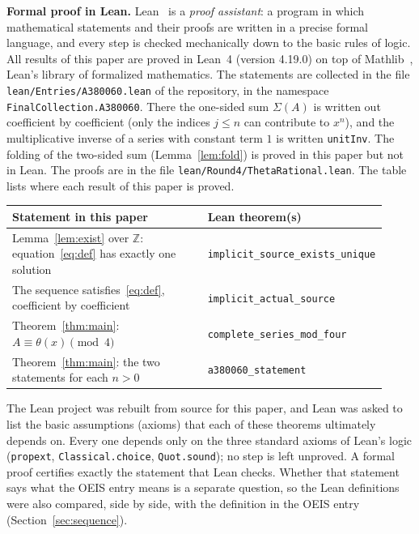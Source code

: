 \documentclass[11pt,a4paper]{article}
\theoremstyle{definition}
\theoremstyle{remark}
\newcommand{\Z}{\mathbb{Z}}
\newcommand{\para}[1]{\par\medskip\noindent\textbf{#1}\enspace}
\begin{document}
\para{Formal proof in Lean.}
Lean~\cite{lean} is a \emph{proof assistant}: a program in which mathematical statements and their proofs are written
in a precise formal language, and every step is checked mechanically down to the basic rules of logic. All results of
this paper are proved in Lean~4 (version 4.19.0) on top of Mathlib~\cite{mathlib}, Lean's library of formalized
mathematics. The statements are collected in the file \texttt{lean/Entries/A380060.lean} of the repository,
in the namespace \texttt{FinalCollection.A380060}. There the one-sided sum $\Sigma(A)$ is written out coefficient by coefficient (only the indices $j\le n$ can contribute to $x^n$), and the multiplicative inverse of a series with constant term $1$ is written \texttt{unitInv}. The folding of the two-sided sum (Lemma~\ref{lem:fold}) is proved in this paper but not in Lean. The proofs are in the file \texttt{lean/Round4/ThetaRational.lean}. 
The table lists where each result of this paper is proved.
\begin{center}\small\renewcommand{\arraystretch}{1.25}
\begin{tabular}{>{\raggedright\arraybackslash}p{0.52\linewidth}>{\raggedright\arraybackslash}p{0.4\linewidth}}
\toprule
Statement in this paper & Lean theorem(s)\\
\midrule
Lemma~\ref{lem:exist} over $\Z$: equation~\eqref{eq:def} has exactly one solution & \texttt{implicit\_\allowbreak{}source\_\allowbreak{}exists\_\allowbreak{}unique} \\
The sequence satisfies~\eqref{eq:def}, coefficient by coefficient & \texttt{implicit\_\allowbreak{}actual\_\allowbreak{}source} \\
Theorem~\ref{thm:main}: $A\equiv\theta(x)\pmod4$ & \texttt{complete\_\allowbreak{}series\_\allowbreak{}mod\_\allowbreak{}four} \\
Theorem~\ref{thm:main}: the two statements for each $n>0$ & \texttt{a380060\_\allowbreak{}statement} \\
\bottomrule
\end{tabular}
\end{center}
The Lean project was rebuilt from source for this paper, and Lean was asked to list the basic assumptions (axioms)
that each of these theorems ultimately depends on. Every one depends only on the three standard axioms of Lean's logic
(\texttt{propext}, \texttt{Classical.choice}, \texttt{Quot.sound}); no step is left unproved. A formal proof certifies
exactly the statement that Lean checks. Whether that statement says what the OEIS entry means is a separate question,
so the Lean definitions were also compared, side by side, with the definition in the OEIS entry
(Section~\ref{sec:sequence}).
\end{document}
